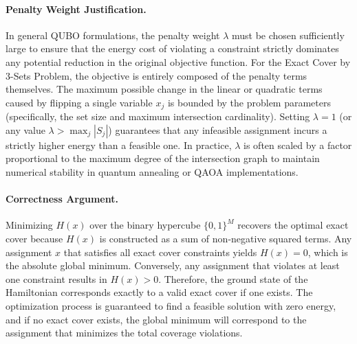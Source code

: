 \documentclass[12pt]{article}
\begin{document}
\paragraph{Penalty Weight Justification.}
In general QUBO formulations, the penalty weight $\lambda$ must be chosen sufficiently large to ensure that the energy cost of violating a constraint strictly dominates any potential reduction in the original objective function. For the Exact Cover by 3-Sets Problem, the objective is entirely composed of the penalty terms themselves. The maximum possible change in the linear or quadratic terms caused by flipping a single variable $x_j$ is bounded by the problem parameters (specifically, the set size and maximum intersection cardinality). Setting $\lambda = 1$ (or any value $\lambda > \max_{j} |S_j|$) guarantees that any infeasible assignment incurs a strictly higher energy than a feasible one. In practice, $\lambda$ is often scaled by a factor proportional to the maximum degree of the intersection graph to maintain numerical stability in quantum annealing or QAOA implementations.

\paragraph{Correctness Argument.}
Minimizing $H(x)$ over the binary hypercube $\{0,1\}^M$ recovers the optimal exact cover because $H(x)$ is constructed as a sum of non-negative squared terms. Any assignment $x$ that satisfies all exact cover constraints yields $H(x) = 0$, which is the absolute global minimum. Conversely, any assignment that violates at least one constraint results in $H(x) > 0$. Therefore, the ground state of the Hamiltonian corresponds exactly to a valid exact cover if one exists. The optimization process is guaranteed to find a feasible solution with zero energy, and if no exact cover exists, the global minimum will correspond to the assignment that minimizes the total coverage violations.
\end{document}
